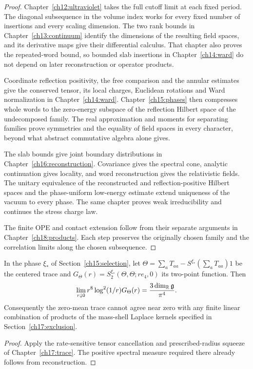 \begin{proof}
Chapter~\ref{ch12:ultraviolet} takes the full cutoff
limit at each fixed period. The diagonal subsequence in the volume index works for every fixed
number of insertions and every scaling dimension. The two rank bounds
in Chapter~\ref{ch13:continuum} identify the dimensions of the resulting
field spaces, and its derivative maps give their differential calculus. That chapter also proves the repeated-word bound,
so bounded slab insertions in Chapter~\ref{ch14:ward} do not depend on
later reconstruction or operator products.

Coordinate reflection positivity, the free comparison and the annular
estimates give the conserved tensor, its local charges, Euclidean
rotations and Ward normalization in Chapter~\ref{ch14:ward}.
Chapter~\ref{ch15:phases} then compresses whole words to the zero-energy
subspace of the reflection Hilbert space of the undecomposed family. The real approximation and moments for separating families prove
symmetries and the equality of field spaces in every character, beyond
what abstract commutative algebra alone gives.

The slab bounds give joint boundary distributions in
Chapter~\ref{ch16:reconstruction}. Covariance gives the spectral cone,
analytic continuation gives locality, and word reconstruction gives
the relativistic fields. The unitary equivalence of the reconstructed and reflection-positive Hilbert spaces and the
phase-uniform low-energy estimate extend uniqueness of the vacuum to every phase. The same
chapter proves weak irreducibility and continues the stress charge law.

The finite OPE and contact extension follow from their separate arguments in
Chapter~\ref{ch18:products}. Each step preserves the originally chosen
family and the correlation limits along the chosen subsequence.
\end{proof}

\begin{corollary}
\label{ch19:conditional-trace}
In the phase $\xi_*$ of Section~\ref{ch15:selection}, let
$\Theta=\sum_aT_{aa}-S^{\xi_*}(\sum_aT_{aa})1$ be the centered trace and
$G_\Theta(r)=S_2^{\xi_*}(\Theta,\Theta;re_4,0)$ its two-point function.
Then
\[
 \lim_{r\downarrow0}r^8\log^2(1/r)G_\Theta(r)
                    =\frac{3\dim_\mathbb R\mathfrak g}{\pi^4}.
\]
Consequently the zero-mean trace cannot agree near zero with any finite linear combination of products of the
mass-shell Laplace kernels specified in Section~\ref{ch17:exclusion}.
\end{corollary}
\begin{proof}
Apply the rate-sensitive tensor cancellation and prescribed-radius
squeeze of Chapter~\ref{ch17:trace}. The positive spectral measure
required there already follows from reconstruction.
\end{proof}

